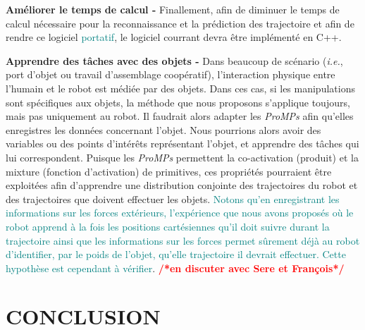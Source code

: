 \documentclass[utf8]{frontiersSCNS} %
\newcommand{\ori}[1]{\textcolor{teal}{#1}}
\newcommand{\toimprove}[1]{\textcolor{teal}{#1}}
\newcommand{\todo}[1]{\textcolor{red}{\textbf{/*#1*/}}}
\begin{document}
\textbf{Améliorer le temps de calcul -} Finallement, afin de diminuer le temps de calcul nécessaire pour la reconnaissance et la prédiction des trajectoire et afin de rendre ce logiciel \toimprove{portatif}, le logiciel courrant devra être implémenté en C++.

\textbf{Apprendre des tâches avec des objets -} Dans beaucoup de scénario (\textit{i.e.}, port d'objet ou travail d'assemblage coopératif), l'interaction physique entre l'humain et le robot est médiée par des objets. Dans ces cas, si les manipulations sont spécifiques aux objets, la méthode que nous proposons s'applique toujours, mais pas uniquement au robot. Il faudrait alors adapter les \textit{ProMPs} afin qu'elles enregistres les données concernant l'objet.  Nous pourrions alors avoir des variables ou des points d’intérêts représentant l'objet, et apprendre des tâches qui lui correspondent. Puisque les \textit{ProMPs} permettent la co-activation (produit) et la mixture (fonction d'activation) de primitives, ces propriétés pourraient être exploitées afin d'apprendre une distribution conjointe des trajectoires du robot et des trajectoires que doivent effectuer les objets.
\ori{Notons qu'en enregistrant les informations sur les forces extérieurs, l'expérience que nous avons proposés où le robot apprend à la fois les positions cartésiennes qu'il doit suivre durant la trajectoire ainsi que les informations sur les forces permet sûrement déjà au robot d'identifier, par le poids de l'objet, qu'elle trajectoire il devrait effectuer. Cette hypothèse est cependant à vérifier}. \todo{en discuter avec Sere et François}

\section{CONCLUSION}
\label{sec:conclusions}
\end{document}

